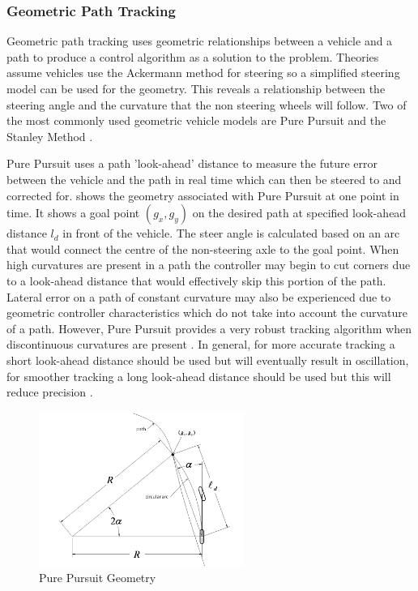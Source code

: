 \documentclass[main.tex]{subfiles}
\begin{document}
\subsubsection{Geometric Path Tracking}
Geometric path tracking uses geometric relationships between a vehicle and a path to produce a control algorithm as a solution to the problem. Theories assume vehicles use the Ackermann method for steering so a simplified steering model can be used for the geometry. This reveals a relationship between the steering angle and the curvature that the non steering wheels will follow. Two of the most commonly used geometric vehicle models are Pure Pursuit and the Stanley Method \parencite{snider2009}.

Pure Pursuit uses a path 'look-ahead' distance to measure the future error between the vehicle and the path in real time which can then be steered to and corrected for.  shows the geometry associated with Pure Pursuit at one point in time. It shows a goal point $(g_x, g_y)$ on the desired path at specified look-ahead distance $l_d$ in front of the vehicle. The steer angle is calculated based on an arc that would connect the centre of the non-steering axle to the goal point. When high curvatures are present in a path the controller may begin to cut corners due to a look-ahead distance that would effectively skip this portion of the path. Lateral error on a path of constant curvature may also be experienced due to geometric controller characteristics which do not take into account the curvature of a path. However, Pure Pursuit provides a very robust tracking algorithm when discontinuous curvatures are present \parencite{snider2009}. In general, for more accurate tracking a short look-ahead distance should be used but will eventually result in oscillation, for smoother tracking a long look-ahead distance should be used but this will reduce precision \parencite{snider2009}.
\begin{figure}[ht]
\includegraphics[width=0.6\textwidth]{3-LiteratureReview/purePursuitGoal.png}
\centering
\caption[Pure Pursuit Geometry]{Pure Pursuit Geometry \parencite{snider2009}} 
\end{figure}
\end{document}
